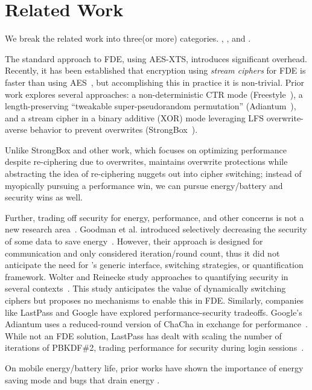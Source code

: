 \section{Related Work}\label{sec:related}

We break the related work into three(or more\xxx) categories. \xxx, \xxx, and
\xxx. 

The standard approach to FDE, using AES-XTS, introduces significant overhead.
Recently, it has been established that encryption using \emph{stream ciphers}
for FDE is faster than using AES~\cite{StrongBox}, but accomplishing this in
practice it is non-trivial. Prior work explores several approaches: a
non-deterministic CTR mode (Freestyle~\cite{Freestyle}), a length-preserving
``tweakable super-pseudorandom permutation'' (Adiantum~\cite{Adiantum}), and a
stream cipher in a binary additive (XOR) mode leveraging LFS overwrite-averse
behavior to prevent overwrites (StrongBox~\cite{StrongBox}).

Unlike StrongBox and other work, which focuses on optimizing performance despite
re-ciphering due to overwrites, \sys maintains overwrite protections
while abstracting the idea of re-ciphering nuggets out into cipher switching;
instead of myopically pursuing a performance win, we can pursue energy/battery
and security wins as well.

Further, trading off security for energy, performance, and other concerns is not
a new research area~\cite{ScalableSecurity, WolterReinecke, ZengChow1,
HaleemEtAl, LiOmiecinski, Merkel4, Merkle3}. Goodman et al. introduced
selectively decreasing the security of some data to save
energy~\cite{ScalableSecurity}. However, their approach is designed for
communication and only considered iteration/round count, thus it did not
anticipate the need for \sys's generic interface, switching strategies,
or quantification framework. Wolter and Reinecke study approaches to quantifying
security in several contexts~\cite{WolterReinecke}. This study anticipates the
value of dynamically switching ciphers but proposes no mechanisms to enable this
in FDE. Similarly, companies like LastPass and Google have explored
performance-security tradeoffs. Google's Adiantum uses a reduced-round version
of ChaCha in exchange for performance~\cite{Adiantum}. While not an FDE
solution, LastPass has dealt with scaling the number of iterations of PBKDF\#2,
trading performance for security during login sessions~\cite{LastPass}.

On mobile energy/battery life, prior works have shown the importance of energy
saving mode and bugs that drain energy \cite{yuan-yuan-zhou-work, ..}.
